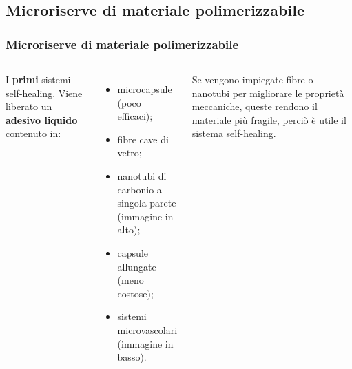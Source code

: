 
\subsection{Microriserve di materiale polimerizzabile}
\begin{frame}\frametitle{Microriserve di materiale polimerizzabile}
\begin{columns}
I \textbf{primi} sistemi self-healing. Viene liberato un \textbf{adesivo liquido} contenuto in: 
\begin{itemize}
 \item microcapsule (poco efficaci);
 \item fibre cave di vetro;
 \item nanotubi di carbonio a singola parete {\tiny(immagine in alto)};
 \item capsule allungate (meno costose);
 \item sistemi microvascolari {\tiny(immagine in basso)}. 
\end{itemize}
Se vengono impiegate fibre o nanotubi per migliorare le proprietà meccaniche, queste rendono il materiale più fragile, perciò è utile il sistema self-healing.


\end{columns}
\end{frame}
